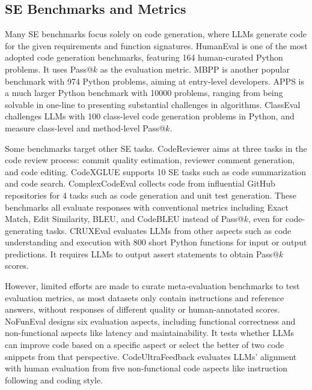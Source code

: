\subsection{SE Benchmarks and Metrics}
Many SE benchmarks focus solely on code generation, where LLMs generate code for the given requirements and function signatures. HumanEval \cite{DBLP:journals/corr/abs-2107-03374} is one of the most adopted code generation benchmarks, featuring 164 human-curated Python problems. It uses Pass@\(k\) as the evaluation metric. %
MBPP \cite{DBLP:journals/corr/abs-2108-07732} is another popular benchmark with 974 Python problems, aiming at entry-level developers. APPS \cite{DBLP:conf/nips/HendrycksBKMAGB21} is a much larger Python benchmark with 10000 problems, ranging from being solvable in one-line to presenting substantial challenges in algorithms. %
ClassEval \cite{DBLP:journals/corr/abs-2308-01861} challenges LLMs with 100 class-level code generation problems in Python, and measure class-level and method-level Pass@\(k\). 

Some benchmarks target other SE tasks. CodeReviewer \cite{DBLP:conf/sigsoft/LiLGDJJMGSFS22} aims at three tasks in the code review process: commit quality estimation, reviewer comment generation, and code editing. CodeXGLUE \cite{DBLP:conf/nips/LuGRHSBCDJTLZSZ21} supports 10 SE tasks such as code summarization and code search. ComplexCodeEval \cite{DBLP:journals/corr/abs-2409-10280} collects code from influential GitHub repositories for 4 tasks such as code generation and unit test generation. These benchmarks all evaluate responses with conventional metrics including Exact Match, Edit Similarity, BLEU, and CodeBLEU instead of Pass@\(k\), even for code-generating tasks. CRUXEval \cite{DBLP:conf/icml/GuRLSS024} evaluates LLMs from other aspects such as code understanding and execution with 800 short Python functions for input or output predictions. It requires LLMs to output assert statements to obtain Pass@\(k\) scores. 

However, limited efforts are made to curate meta-evaluation benchmarks to test evaluation metrics, as most datasets only contain instructions and reference answers, without responses of different quality or human-annotated scores. NoFunEval \cite{DBLP:journals/corr/abs-2401-15963} designs six evaluation aspects, including functional correctness and non-functional aspects like latency and maintainability. It tests whether LLMs can improve code based on a specific aspect or select the better of two code snippets from that perspective. CodeUltraFeedback \cite{DBLP:journals/corr/abs-2403-09032} evaluates LLMs' alignment with human evaluation from five non-functional code aspects like instruction following and coding style.

